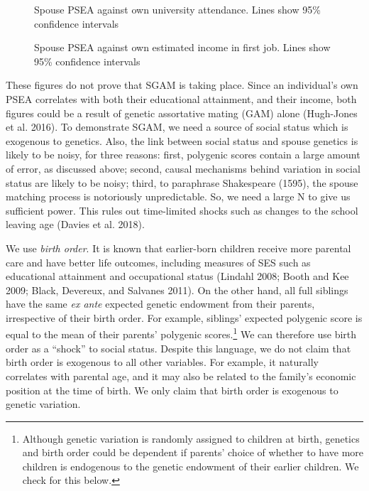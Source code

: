 \documentclass[
]{article}
\begin{document}
\begin{figure}
\caption{Spouse PSEA against own university attendance. Lines show 95\% confidence intervals}\label{fig:pic-basic-corr-uni}
\end{figure}

\begin{figure}
\caption{Spouse PSEA against own estimated income in first job. Lines show 95\% confidence intervals}\label{fig:pic-basic-corr-income}
\end{figure}

These figures do not prove that SGAM is taking place. Since an
individual's own PSEA correlates with both their educational attainment,
and their income, both figures could be a result of genetic assortative
mating (GAM) alone (Hugh-Jones et al. 2016). To demonstrate SGAM, we need
a source of social status which is exogenous to genetics. Also, the link
between social status and spouse genetics is likely to be noisy, for
three reasons: first, polygenic scores contain a large amount of error, as
discussed above; second, causal mechanisms behind variation in social status
are likely to be noisy; third, to paraphrase Shakespeare (1595), the
spouse matching process is notoriously unpredictable. So, we need a large N to
give us sufficient power. This rules out time-limited shocks such as
changes to the school leaving age (Davies et al. 2018).

We use \emph{birth order}. It is known that earlier-born children receive more
parental care and have better life outcomes, including measures of SES such as
educational attainment and occupational status (Lindahl 2008; Booth and Kee 2009; Black, Devereux, and Salvanes 2011). On the other hand, all full siblings have the same \emph{ex ante}
expected genetic endowment from their parents, irrespective of their birth
order. For example, siblings' expected polygenic score is equal to the mean of
their parents' polygenic scores.\footnote{Although genetic variation is randomly assigned to children at
  birth, genetics and birth order could be dependent if parents'
  choice of whether to have more children is endogenous to the genetic
  endowment of their earlier children. We check for this below.} We can therefore use birth order as a
``shock'' to social status. Despite this language, we do not claim that birth
order is exogenous to all other variables. For example, it naturally correlates
with parental age, and it may also be related to the family's economic position at
the time of birth. We only claim that birth order is exogenous to genetic
variation.
\end{document}
